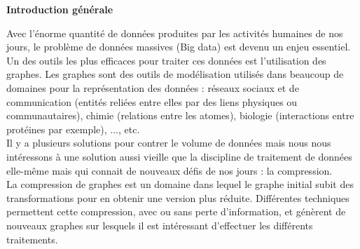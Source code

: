 \documentclass[a4paper,oneside,12pt]{report}
\theoremstyle{definition}
\begin{document}






\pagestyle{plain}
\tableofcontents
\newpage



\listoffigures
{}
\cleardoublepage


\listoftables
{}



\printglossaries



\cleardoublepage



	\thispagestyle{plain}
		\Huge{ 
			\textbf {Introduction générale}} \\[0.5in]
			\normalsize
			Avec l'énorme quantité de données produites par les activités humaines de nos jours, le problème de données massives (Big data) est devenu un enjeu essentiel. Un des outils les plus efficaces pour traiter ces données est l'utilisation des graphes. Les graphes sont des outils de modélisation utilisés dans beaucoup de domaines pour la représentation des données : réseaux sociaux et de communication (entités reliées entre elles par des liens physiques ou communautaires), chimie (relations entre les atomes), biologie (interactions entre protéines par exemple), ..., etc.\\
			
Il y a plusieurs solutions pour contrer le volume de données mais nous nous intéressons à une solution aussi vieille que la discipline de traitement de données elle-même mais qui connait de nouveaux défis de nos jours : la compression.\\

La compression de graphes est un domaine dans lequel le graphe initial subit des transformations pour en obtenir une version plus réduite. Différentes techniques permettent cette compression, avec ou sans perte d'information, et génèrent de nouveaux graphes sur lesquels il est intéressant d'effectuer les différents traitements.\\ 
\end{document}
